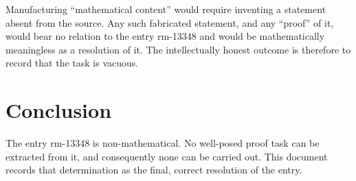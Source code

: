 \documentclass{amsart}
\begin{document}
Manufacturing ``mathematical content'' would require inventing a statement
absent from the source. Any such fabricated statement, and any ``proof'' of
it, would bear no relation to the entry rm-13348 and would be mathematically
meaningless as a resolution of it. The intellectually honest outcome is
therefore to record that the task is vacuous.

\section*{Conclusion}

The entry rm-13348 is non-mathematical. No well-posed proof task can be
extracted from it, and consequently none can be carried out. This document
records that determination as the final, correct resolution of the entry.
\end{document}
